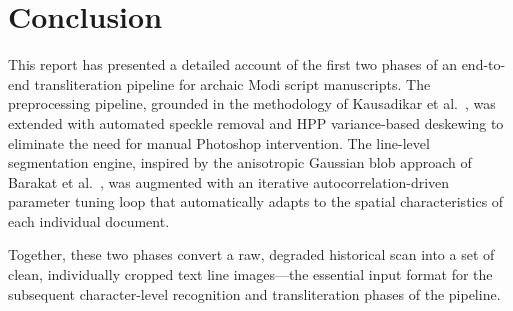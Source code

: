 \documentclass[12pt, a4paper]{article}
\begin{document}
\section{Conclusion}

This report has presented a detailed account of the first two phases of an end-to-end transliteration pipeline for archaic Modi script manuscripts. The preprocessing pipeline, grounded in the methodology of Kausadikar et al.~\cite{kausadikar2025}, was extended with automated speckle removal and HPP variance-based deskewing to eliminate the need for manual Photoshop intervention. The line-level segmentation engine, inspired by the anisotropic Gaussian blob approach of Barakat et al.~\cite{barakat2020}, was augmented with an iterative autocorrelation-driven parameter tuning loop that automatically adapts to the spatial characteristics of each individual document.

Together, these two phases convert a raw, degraded historical scan into a set of clean, individually cropped text line images---the essential input format for the subsequent character-level recognition and transliteration phases of the pipeline.
\end{document}
